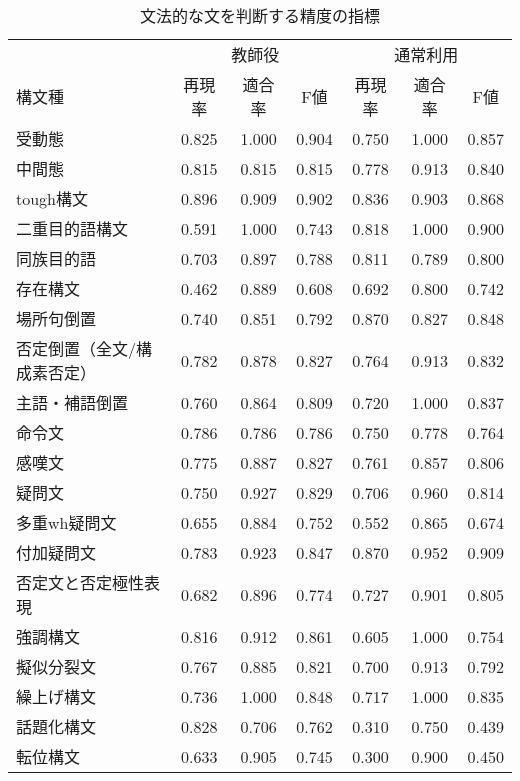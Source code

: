 \begin{table}[H]
    \centering
    \small
    \tabcolsep 3pt
    \caption{文法的な文を判断する精度の指標}
    \label{tab:sample2}
    \begin{tabular}{lcccccc}
    \hline
    \multicolumn{1}{l}{} & \multicolumn{3}{c}{教師役} & \multicolumn{3}{c}{通常利用}\\
    構文種 & 再現率 & 適合率 &F値 & 再現率 & 適合率 &F値\\
    \hline
    受動態 & 0.825 & 1.000 & 0.904 & 0.750 & 1.000 & 0.857 \\ 
    中間態 & 0.815 & 0.815 & 0.815 & 0.778 & 0.913 & 0.840 \\ 
    tough構文 & 0.896 & 0.909 & 0.902 & 0.836 & 0.903 & 0.868 \\ 
    二重目的語構文 & 0.591 & 1.000 & 0.743 & 0.818 & 1.000 & 0.900 \\ 
    同族目的語 & 0.703 & 0.897 & 0.788 & 0.811 & 0.789 & 0.800 \\ 
    存在構文 & 0.462 & 0.889 & 0.608 & 0.692 & 0.800 & 0.742 \\ 
    場所句倒置 & 0.740 & 0.851 & 0.792 & 0.870 & 0.827 & 0.848 \\ 
    否定倒置（全文/構成素否定） & 0.782 & 0.878 & 0.827 & 0.764 & 0.913 & 0.832 \\ 
    主語・補語倒置 & 0.760 & 0.864 & 0.809 & 0.720 & 1.000 & 0.837 \\ 
    命令文 & 0.786 & 0.786 & 0.786 & 0.750 & 0.778 & 0.764 \\ 
    感嘆文 & 0.775 & 0.887 & 0.827 & 0.761 & 0.857 & 0.806 \\ 
    疑問文 & 0.750 & 0.927 & 0.829 & 0.706 & 0.960 & 0.814 \\ 
    多重wh疑問文 & 0.655 & 0.884 & 0.752 & 0.552 & 0.865 & 0.674 \\ 
    付加疑問文 & 0.783 & 0.923 & 0.847 & 0.870 & 0.952 & 0.909 \\ 
    否定文と否定極性表現 & 0.682 & 0.896 & 0.774 & 0.727 & 0.901 & 0.805 \\ 
    強調構文 & 0.816 & 0.912 & 0.861 & 0.605 & 1.000 & 0.754 \\ 
    擬似分裂文 & 0.767 & 0.885 & 0.821 & 0.700 & 0.913 & 0.792 \\
    繰上げ構文 & 0.736 & 1.000 & 0.848 & 0.717 & 1.000 & 0.835 \\
    話題化構文 & 0.828 & 0.706 & 0.762 & 0.310 & 0.750 & 0.439 \\
    転位構文 & 0.633 & 0.905 & 0.745 & 0.300 & 0.900 & 0.450 \\

\end{tabular}
\end{table}
